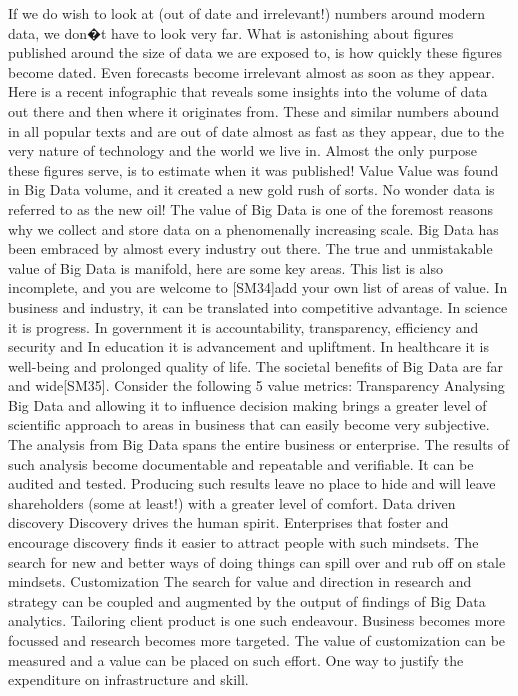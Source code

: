 \documentclass{book}
\begin{document}
If we do wish to look at (out of date and irrelevant!) numbers around modern data, we don�t have to look very far.  What is astonishing about figures published around the size of data we are exposed to, is how quickly these figures become dated.  Even forecasts become irrelevant almost as soon as they appear.  Here is a recent infographic that reveals some insights into the volume of data out there and then where it originates from. 
These and similar numbers abound in all popular texts and are out of date almost as fast as they appear, due to the very nature of technology and the world we live in.  Almost the only purpose these figures serve, is to estimate when it was published! 
Value 
Value was found in Big Data volume, and it created a new gold rush of sorts.  No wonder data is referred to as the new oil!  The value of Big Data is one of the foremost reasons why we collect and store data on a phenomenally increasing scale.  Big Data has been embraced by almost every industry out there.
The true and unmistakable value of Big Data is manifold, here are some key areas.  This list is also incomplete, and you are welcome to [SM34]add your own list of areas of value.
In business and industry, it can be translated into competitive advantage. 
In science it is progress.
In government it is accountability, transparency, efficiency and security and 
In education it is advancement and upliftment.
In healthcare it is well-being and prolonged quality of life.
The societal benefits of Big Data are far and wide[SM35].  
Consider the following 5 value metrics:
Transparency
Analysing Big Data and allowing it to influence decision making brings a greater level of scientific approach to areas in business that can easily become very subjective.  The analysis from Big Data spans the entire business or enterprise.  The results of such analysis become documentable and repeatable and verifiable.  It can be audited and tested.  Producing such results leave no place to hide and will leave shareholders (some at least!) with a greater level of comfort.
Data driven discovery
Discovery drives the human spirit.  Enterprises that foster and encourage discovery finds it easier to attract people with such mindsets. The search for new and better ways of doing things can spill over and rub off on stale mindsets.
Customization
The search for value and direction in research and strategy can be coupled and augmented by the output of findings of Big Data analytics.   Tailoring client product is one such endeavour.  Business becomes more focussed and research becomes more targeted.  The value of customization can be measured and a value can be placed on such effort.  One way to justify the expenditure on infrastructure and skill.
\end{document}
